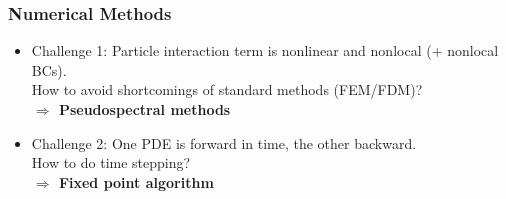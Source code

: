 \documentclass[aspectratio=169,xcolor=dvipsnames]{beamer}
\begin{document}
\begin{frame}
	\frametitle{Numerical Methods}

	\begin{itemize} 
		\item Challenge 1: Particle interaction term is nonlinear and nonlocal (+ nonlocal BCs).
		\\How to avoid shortcomings of standard methods (FEM/FDM)?\\
		\vspace{0.3 cm}		
		\textbf{$\Rightarrow$ Pseudospectral methods}		
		\vspace{0.2 cm}
		\item Challenge 2: One PDE is forward in time, the other backward. \\How to do time stepping?\\
		\vspace{0.3 cm}	
		\textbf{$\Rightarrow$ Fixed point algorithm}
	\end{itemize}

\end{frame}
\end{document}
